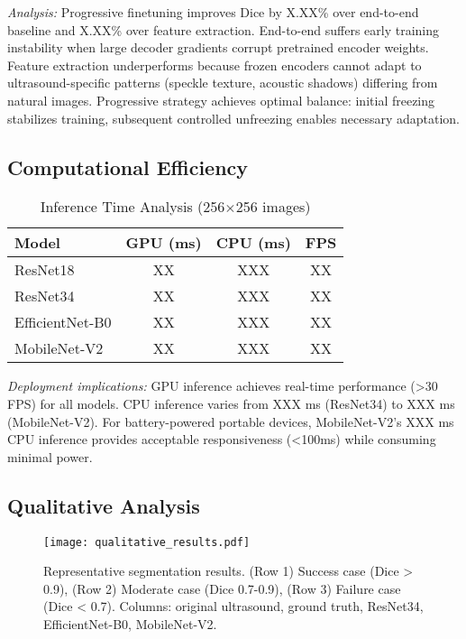 \documentclass{article}
\begin{document}
\textit{Analysis:} Progressive finetuning improves Dice by X.XX\% over end-to-end baseline and X.XX\% over feature extraction. End-to-end suffers early training instability when large decoder gradients corrupt pretrained encoder weights. Feature extraction underperforms because frozen encoders cannot adapt to ultrasound-specific patterns (speckle texture, acoustic shadows) differing from natural images. Progressive strategy achieves optimal balance: initial freezing stabilizes training, subsequent controlled unfreezing enables necessary adaptation.

\subsection{Computational Efficiency}

\begin{table}[t]
\centering
\caption{Inference Time Analysis (256$\times$256 images)}
\label{tab:inference}
\begin{tabular}{@{}lccc@{}}
\toprule
\textbf{Model} & \textbf{GPU (ms)} & \textbf{CPU (ms)} & \textbf{FPS} \\
\midrule
ResNet18 & XX & XXX & XX \\
ResNet34 & XX & XXX & XX \\
EfficientNet-B0 & XX & XXX & XX \\
MobileNet-V2 & XX & XXX & XX \\
\bottomrule
\end{tabular}
\end{table}

\textit{Deployment implications:} GPU inference achieves real-time performance (>30 FPS) for all models. CPU inference varies from XXX ms (ResNet34) to XXX ms (MobileNet-V2). For battery-powered portable devices, MobileNet-V2's XXX ms CPU inference provides acceptable responsiveness (<100ms) while consuming minimal power.

\subsection{Qualitative Analysis}

\begin{figure}[t]
\centering
\texttt{[image: qualitative\_results.pdf]}
\caption{Representative segmentation results. (Row 1) Success case (Dice > 0.9), (Row 2) Moderate case (Dice 0.7-0.9), (Row 3) Failure case (Dice < 0.7). Columns: original ultrasound, ground truth, ResNet34, EfficientNet-B0, MobileNet-V2.}
\label{fig:qualitative}
\end{figure}
\end{document}
